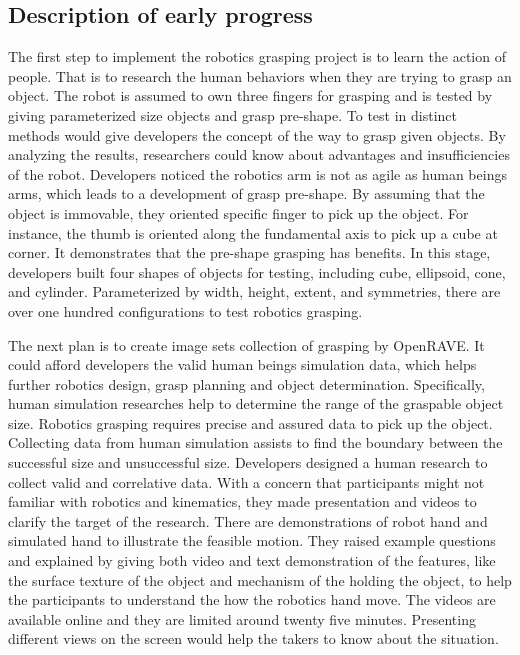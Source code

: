 \documentclass[letterpaper,10pt,fleqn,draftclsnofoot,onecolumn]{IEEEtran}
\begin{document}
{	\subsection{Description of early progress}
	The first step to implement the robotics grasping project is to learn the action of people. That is to research the human behaviors when they are trying to grasp an object. The robot is assumed to own three fingers for grasping and is tested by giving parameterized size objects and grasp pre-shape. To test in distinct methods would give developers the concept of the way to grasp given objects. By analyzing the results, researchers could know about advantages and insufficiencies of the robot. Developers noticed the robotics arm is not as agile as human beings arms, which leads to a development of grasp pre-shape. By assuming that the object is immovable, they oriented specific finger to pick up the object. For instance, the thumb is oriented along the fundamental axis to pick up a cube at corner. It demonstrates that the pre-shape grasping has benefits. In this stage, developers built four shapes of objects for testing, including cube, ellipsoid, cone, and cylinder. Parameterized by width, height, extent, and symmetries, there are over one hundred configurations to test robotics grasping. \newline
	
	The next plan is to create image sets collection of grasping by OpenRAVE. It could afford developers the valid human beings simulation data, which helps further robotics design, grasp planning and object determination. Specifically, human simulation researches help to determine the range of the graspable object size. Robotics grasping requires precise and assured data to pick up the object. Collecting data from human simulation assists to find the boundary between the successful size and unsuccessful size. Developers designed a human research to collect valid and correlative data. With a concern that participants might not familiar with robotics and kinematics, they made presentation and videos to clarify the target of the research. There are demonstrations of robot hand and simulated hand to illustrate the feasible motion. They raised example questions and explained by giving both video and text demonstration of the features, like the surface texture of the object and mechanism of the holding the object, to help the participants to understand the how the robotics hand move. The videos are available online and they are limited around twenty five minutes. Presenting different views on the screen would help the takers to know about the situation. \newline
	
}
\end{document}

